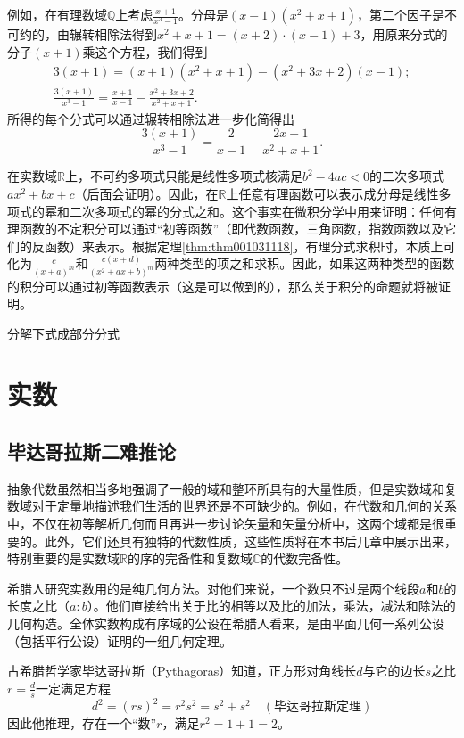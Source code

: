 例如，在有理数域$\mathbb{Q}$上考虑$\frac{x+1}{x^3-1}$。分母是$(x-1)(x^2+x+1)$，第二个因子是不可约的，由辗转相除法得到$x^2+x+1 = (x+2) \cdot (x-1) + 3$，用原来分式的分子$(x+1)$乘这个方程，我们得到
\begin{gather*}
3(x+1) = (x+1)(x^2+x+1)- (x^2 + 3x + 2)(x-1);\\
\frac{3(x+1)}{x^3-1} = \frac{x+1}{x-1} - \frac{x^2+3x+2}{x^2+x+1}.
\end{gather*}
所得的每个分式可以通过辗转相除法进一步化简得出
\[
\frac{3(x+1)}{x^3-1} = \frac{2}{x-1} - \frac{2x+1}{x^2+x+1}.
\]

在实数域$\mathbb{R}$上，不可约多项式只能是线性多项式核满足$b^2-4ac<0$的二次多项式$ax^2+bx+c$（后面会证明）。因此，在$\mathbb{R}$上任意有理函数可以表示成分母是线性多项式的幂和二次多项式的幂的分式之和。这个事实在微积分学中用来证明：任何有理函数的不定积分可以通过“初等函数”（即代数函数，三角函数，指数函数以及它们的反函数）来表示。根据定理\ref{thm:thm001031118}，有理分式求积时，本质上可化为$\frac{c}{(x+a)^m}$和$\frac{c(x+d)}{(x^2+ax+b)^m}$两种类型的项之和求积。因此，如果这两种类型的函数的积分可以通过初等函数表示（这是可以做到的），那么关于积分的命题就将被证明。

\begin{problem}
分解下式成部分分式
\end{problem}


\chapter{实数}\label{section00104}

\section{毕达哥拉斯二难推论}\label{subsection0010401}
抽象代数虽然相当多地强调了一般的域和整环所具有的大量性质，但是实数域和复数域对于定量地描述我们生活的世界还是不可缺少的。例如，在代数和几何的关系中，不仅在初等解析几何而且再进一步讨论矢量和矢量分析中，这两个域都是很重要的。此外，它们还具有独特的代数性质，这些性质将在本书后几章中展示出来，特别重要的是实数域$\mathbb{R}$的序的完备性和复数域$\mathbb{C}$的代数完备性。

希腊人研究实数用的是纯几何方法。对他们来说，一个数只不过是两个线段$a$和$b$的长度之比（$a:b$）。他们直接给出关于比的相等以及比的加法，乘法，减法和除法的几何构造。全体实数构成有序域的公设在希腊人看来，是由平面几何一系列公设（包括平行公设）证明的一组几何定理。

古希腊哲学家毕达哥拉斯（Pythagoras）知道，正方形对角线长$d$与它的边长$s$之比$r = \frac{d}{s}$一定满足方程
\begin{equation}\label{equ001040101}
d^2 = (rs)^2 = r^2s^2 = s^2 + s^2 \quad (\text{毕达哥拉斯定理})
\end{equation}
因此他推理，存在一个“数”$r$，满足$r^2 = 1 + 1 = 2$。


